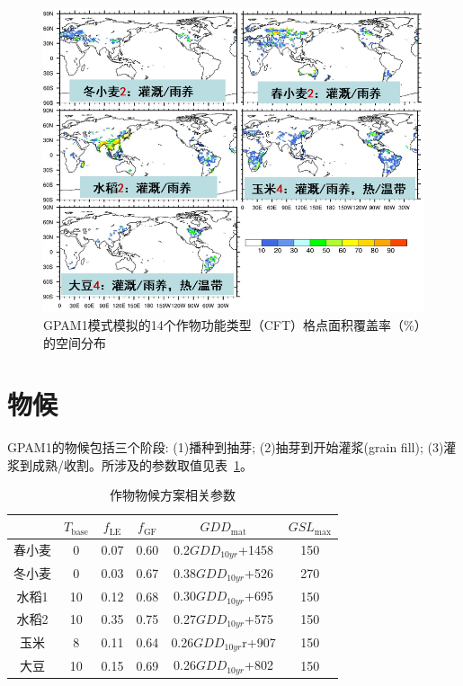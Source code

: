 {
\begin{figure}[htbp]
\centering
\includegraphics[scale=0.9]{Figures/作物模式/GPAM1模式模拟的14个作物功能类型格点面积覆盖率空间分布.png}
\caption{GPAM1模式模拟的14个作物功能类型（CFT）格点面积覆盖率（\%）的空间分布}
\label{fig:作物功能类型覆盖率的空间分布}
\end{figure}
}

\section{物候}
GPAM1的物候包括三个阶段: (1)播种到抽芽; (2)抽芽到开始灌浆(grain fill); (3)灌浆到成熟/收割。所涉及的参数取值见表~\ref{tab:作物物候方案相关参数}。

\begin{table}[htbp]
  \centering
  \caption{作物物候方案相关参数}
  \label{tab:作物物候方案相关参数}
\begin{tabular}{@{}cccccc@{}}
\toprule
    & $T_{\mathrm{base}}$ & $f_{\mathrm{LE}}$  & $f_{\mathrm{GF}}$  & $GDD_{\mathrm{mat}}$          & $GSL_{\mathrm{max}}$ \\ \midrule
春小麦 & 0     & 0.07 & 0.60 & 0.2$GDD_{10yr}$+1458 & 150    \\
冬小麦 & 0     & 0.03 & 0.67 & 0.38$GDD_{10yr}$+526 & 270    \\
水稻1 & 10    & 0.12 & 0.68 & 0.30$GDD_{10yr}$+695 & 150    \\
水稻2 & 10    & 0.35 & 0.75 & 0.27$GDD_{10yr}$+575 & 150    \\
玉米  & 8     & 0.11 & 0.64 & 0.26$GDD_{10yr}$r+907 & 150    \\
大豆  & 10    & 0.15 & 0.69 & 0.26$GDD_{10yr}$+802 & 150    \\ \bottomrule
\end{tabular}
\end{table}

